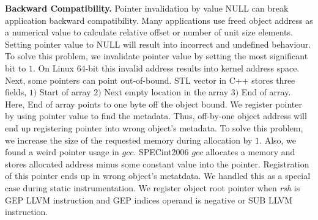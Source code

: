 \textbf{Backward Compatibility.} Pointer invalidation by value NULL can break application backward compatibility. Many applications use freed object address as a numerical value to calculate relative offset or number of unit size elements. Setting pointer value to NULL will result into incorrect and undefined behaviour. To solve this problem, we invalidate pointer value by setting the most significant bit to $1$. On Linux $64$-bit this invalid address results into kernel address space. Next, some pointers can point out-of-bound. STL vector in C++ stores three fields, $1)$ Start of array $2)$ Next empty location in the array $3)$ End of array. Here, End of array points to one byte off the object bound. We register pointer by using pointer value to find the metadata. Thus, off-by-one object address will end up registering pointer into wrong object's metadata. To solve this problem, we increase the size of the requested memory during allocation by $1$. Also, we found a weird pointer usage in $gcc$. SPECint2006 $gcc$ allocates a memory and stores allocated address minus some constant value into the pointer. Registration of this pointer ends up in wrong object's metatdata. We handled this as a special case during static instrumentation. We register object root pointer when \textit{rsh} is GEP LLVM instruction and GEP indices operand is negative or SUB LLVM instruction. \\



